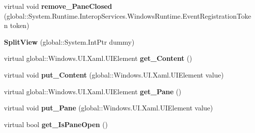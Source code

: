 \begin{DoxyCompactItemize}
\item 
\mbox{\label{class_windows_1_1_u_i_1_1_xaml_1_1_controls_1_1_split_view_a512973422bb0ef5a03c4a96d88f7f082}} 
virtual void {\bfseries remove\+\_\+\+Pane\+Closed} (global\+::\+System.\+Runtime.\+Interop\+Services.\+Windows\+Runtime.\+Event\+Registration\+Token token)
\item 
\mbox{\label{class_windows_1_1_u_i_1_1_xaml_1_1_controls_1_1_split_view_a83623aee98314bfa486d2e3c5b583543}} 
{\bfseries Split\+View} (global\+::\+System.\+Int\+Ptr dummy)
\item 
\mbox{\label{class_windows_1_1_u_i_1_1_xaml_1_1_controls_1_1_split_view_a8e8c81d98be4733b9d0e0c12f077d2ab}} 
virtual global\+::\+Windows.\+U\+I.\+Xaml.\+U\+I\+Element {\bfseries get\+\_\+\+Content} ()
\item 
\mbox{\label{class_windows_1_1_u_i_1_1_xaml_1_1_controls_1_1_split_view_a858c49c1b29c83b8d2256306a2311f25}} 
virtual void {\bfseries put\+\_\+\+Content} (global\+::\+Windows.\+U\+I.\+Xaml.\+U\+I\+Element value)
\item 
\mbox{\label{class_windows_1_1_u_i_1_1_xaml_1_1_controls_1_1_split_view_a6c58d7776daf88d1bd3c41ac7d058eaa}} 
virtual global\+::\+Windows.\+U\+I.\+Xaml.\+U\+I\+Element {\bfseries get\+\_\+\+Pane} ()
\item 
\mbox{\label{class_windows_1_1_u_i_1_1_xaml_1_1_controls_1_1_split_view_a8c4b09d201319f93f6bc55c355264db6}} 
virtual void {\bfseries put\+\_\+\+Pane} (global\+::\+Windows.\+U\+I.\+Xaml.\+U\+I\+Element value)
\item 
\mbox{\label{class_windows_1_1_u_i_1_1_xaml_1_1_controls_1_1_split_view_a0f921a26afd4e2d74579c00a1ab97dee}} 
virtual bool {\bfseries get\+\_\+\+Is\+Pane\+Open} ()
\item 
\mbox{\label{class_windows_1_1_u_i_1_1_xaml_1_1_controls_1_1_split_view_ab5edefa99b08ffbc412d0e00aa5b531c}} 

\end{DoxyCompactItemize}

